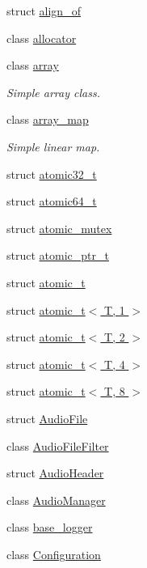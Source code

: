 \begin{DoxyCompactItemize}
\item 
struct \hyperlink{structcrap_1_1align__of}{align\+\_\+of}
\item 
class \hyperlink{classcrap_1_1allocator}{allocator}
\item 
class \hyperlink{classcrap_1_1array}{array}
\begin{DoxyCompactList}\small\item\em Simple array class. \end{DoxyCompactList}\item 
class \hyperlink{classcrap_1_1array__map}{array\+\_\+map}
\begin{DoxyCompactList}\small\item\em Simple linear map. \end{DoxyCompactList}\item 
struct \hyperlink{structcrap_1_1atomic32__t}{atomic32\+\_\+t}
\item 
struct \hyperlink{structcrap_1_1atomic64__t}{atomic64\+\_\+t}
\item 
struct \hyperlink{structcrap_1_1atomic__mutex}{atomic\+\_\+mutex}
\item 
struct \hyperlink{structcrap_1_1atomic__ptr__t}{atomic\+\_\+ptr\+\_\+t}
\item 
struct \hyperlink{structcrap_1_1atomic__t}{atomic\+\_\+t}
\item 
struct \hyperlink{structcrap_1_1atomic__t_3_01_t_00_011_01_4}{atomic\+\_\+t$<$ T, 1 $>$}
\item 
struct \hyperlink{structcrap_1_1atomic__t_3_01_t_00_012_01_4}{atomic\+\_\+t$<$ T, 2 $>$}
\item 
struct \hyperlink{structcrap_1_1atomic__t_3_01_t_00_014_01_4}{atomic\+\_\+t$<$ T, 4 $>$}
\item 
struct \hyperlink{structcrap_1_1atomic__t_3_01_t_00_018_01_4}{atomic\+\_\+t$<$ T, 8 $>$}
\item 
struct \hyperlink{structcrap_1_1_audio_file}{Audio\+File}
\item 
class \hyperlink{classcrap_1_1_audio_file_filter}{Audio\+File\+Filter}
\item 
struct \hyperlink{structcrap_1_1_audio_header}{Audio\+Header}
\item 
class \hyperlink{classcrap_1_1_audio_manager}{Audio\+Manager}
\item 
class \hyperlink{classcrap_1_1base__logger}{base\+\_\+logger}
\item 
class \hyperlink{classcrap_1_1_configuration}{Configuration}

\end{DoxyCompactItemize}
